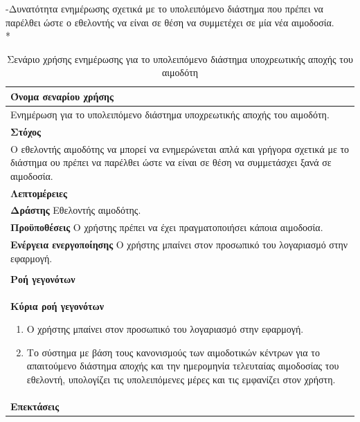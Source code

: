 -Δυνατότητα ενημέρωσης σχετικά με το υπολειπόμενο διάστημα που πρέπει να παρέλθει ώστε ο εθελοντής να είναι σε θέση να συμμετέχει σε μία νέα αιμοδοσία.
\\*
\begin{table}[H]
	\begin{center}
	    \begin{tabular}{|p{\dimexpr \linewidth-2\tabcolsep}|}
	    \hline
	    \rowcolor{grayy}
	    \textbf{Όνομα σεναρίου χρήσης}
	    \\ \hline    
	     Ενημέρωση για το υπολειπόμενο διάστημα υποχρεωτικής αποχής του αιμοδότη.
	     \\ \hline
	    \rowcolor{grayy}
	    \textbf{\textbf{Στόχος}}
	    \\ \hline
	 	 Ο εθελοντής αιμοδότης να μπορεί να ενημερώνεται απλά και γρήγορα σχετικά με το διάστημα ου πρέπει να παρέλθει ώστε να είναι σε θέση να συμμετάσχει ξανά σε αιμοδοσία.
	    \\ \hline
	    \rowcolor{grayy}
	    \textbf{Λεπτομέρειες}
	    \\ \hline
		\textbf{Δράστης} Εθελοντής αιμοδότης.
		\\*
		\textbf{Προϋποθέσεις} Ο χρήστης πρέπει να έχει πραγματοποιήσει κάποια αιμοδοσία.
		\\*
		\textbf{Ενέργεια ενεργοποίησης} Ο χρήστης μπαίνει στον προσωπικό του λογαριασμό στην εφαρμογή.
		\\ \hline
	    \\ \hline
		\rowcolor{grayy}    
	    \textbf{Ροή γεγονότων}
	    \\* 
		\textbf{Κύρια ροή γεγονότων}
		\begin{enumerate}
			\item	 Ο χρήστης μπαίνει στον προσωπικό του λογαριασμό στην εφαρμογή.
			\item  Το σύστημα με βάση τους κανονισμούς των αιμοδοτικών κέντρων για το απαιτούμενο διάστημα αποχής και την ημερομηνία τελευταίας αιμοδοσίας του εθελοντή, υπολογίζει τις υπολειπόμενες μέρες και τις εμφανίζει στον χρήστη.
		\end{enumerate}
		\\*
		\textbf{Επεκτάσεις}
		   \\ \hline
	    \end{tabular}
	    \caption{Σενάριο χρήσης ενημέρωσης για το υπολειπόμενο διάστημα υποχρεωτικής αποχής του αιμοδότη}
	    \label{tab:show_days_for_eligibility_to_donate} 
	\end{center}
\end{table}

